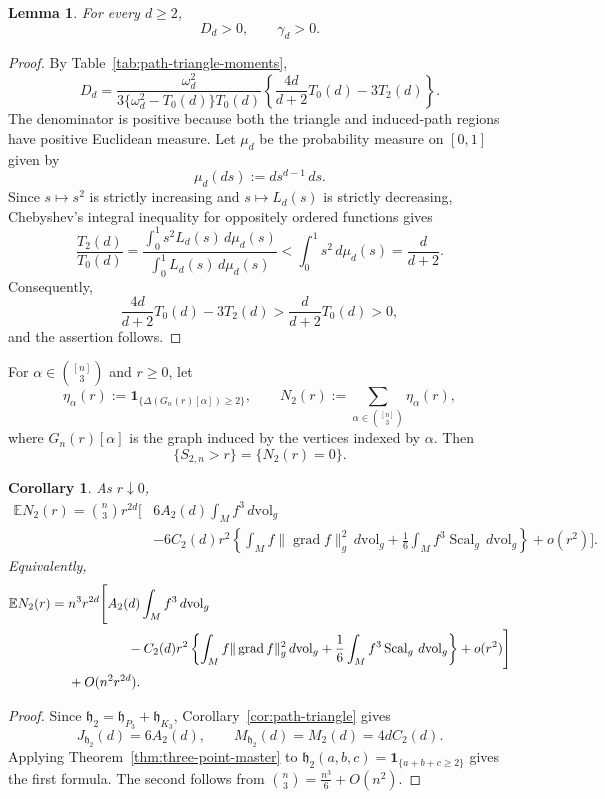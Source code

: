 \documentclass[11pt]{article}
\newtheorem{lemma}[theorem]{Lemma}
\newtheorem{corollary}[theorem]{Corollary}
\theoremstyle{remark}
\newcommand{\Scal}{\operatorname{Scal}}
\newcommand{\grad}{\operatorname{grad}}
\newcommand{\ind}{\mathbf 1}
\newcommand{\E}{\mathbb E}
\numberwithin{equation}{section}
\begin{document}
\begin{lemma}
\label{lem:contrast-nondegeneracy}
For every $d\ge2$,
\[
D_d>0,
\qquad
\gamma_d>0.
\]
\end{lemma}

\begin{proof}
By Table~\ref{tab:path-triangle-moments},
\[
D_d
=\frac{\omega_d^2}{3\{\omega_d^2-T_0(d)\}T_0(d)}
\left\{\frac{4d}{d+2}T_0(d)-3T_2(d)\right\}.
\]
The denominator is positive because both the triangle and induced-path
regions have positive Euclidean measure.  Let $\mu_d$ be the probability
measure on $[0,1]$ given by
\[
\mu_d(ds):=d s^{d-1}\,ds.
\]  Since $s\mapsto s^2$ is
strictly increasing and $s\mapsto L_d(s)$ is strictly decreasing,
Chebyshev's integral inequality for oppositely ordered functions gives
\[
\frac{T_2(d)}{T_0(d)}
=\frac{\int_0^1s^2L_d(s)\,d\mu_d(s)}
       {\int_0^1L_d(s)\,d\mu_d(s)}
<\int_0^1s^2\,d\mu_d(s)
=\frac{d}{d+2}.
\]
Consequently,
\[
\frac{4d}{d+2}T_0(d)-3T_2(d)
>\frac{d}{d+2}T_0(d)>0,
\]
and the assertion follows.
\end{proof}

For $\alpha\in\binom{[n]}{3}$ and $r\ge0$, let
\[
\eta_\alpha(r):=\ind_{\{\Delta(G_n(r)[\alpha])\ge2\}},
\qquad
N_2(r):=\sum_{\alpha\in\binom{[n]}{3}}\eta_\alpha(r),
\]
where $G_n(r)[\alpha]$ is the graph induced by the vertices indexed by
$\alpha$.  Then
\[
\{S_{2,n}>r\}=\{N_2(r)=0\}.
\]


\begin{corollary}
\label{cor:N2-exp}
As $r\downarrow0$,
\[
\begin{aligned}
\E N_2(r)
=\binom{n}{3} r^{2d}\Bigg[&6A_2(d)\int_M f^3\,d\mathrm{vol}_g \\
&-6C_2(d)r^2
\left\{
\int_M f\|\grad f\|_g^2\,d\mathrm{vol}_g
+\frac16\int_M f^3\Scal_g\,d\mathrm{vol}_g
\right\}
+o(r^2)\Bigg].
\end{aligned}
\]
Equivalently,
\[
\begin{aligned}
\E N_2(r)
={}&n^3r^{2d}\Bigg[A_2(d)\int_M f^3\,d\mathrm{vol}_g \\
&\hspace{4.5em}-C_2(d)r^2
\left\{
\int_M f\|\grad f\|_g^2\,d\mathrm{vol}_g
+\frac16\int_M f^3\Scal_g\,d\mathrm{vol}_g
\right\}
+o(r^2)\Bigg]\\
&+O(n^2r^{2d}).
\end{aligned}
\]
\end{corollary}

\begin{proof}
Since
$\mathfrak h_2=\mathfrak h_{P_3}+\mathfrak h_{K_3}$,
Corollary~\ref{cor:path-triangle} gives
\[
J_{\mathfrak h_2}(d)=6A_2(d),
\qquad
M_{\mathfrak h_2}(d)=M_2(d)=4dC_2(d).
\]
Applying Theorem~\ref{thm:three-point-master} to
$\mathfrak h_2(a,b,c)=\ind_{\{a+b+c\ge2\}}$
gives the first formula.  The second follows from
$\binom{n}{3}=\frac{n^3}{6}+O(n^2)$.
\end{proof}
\end{document}
